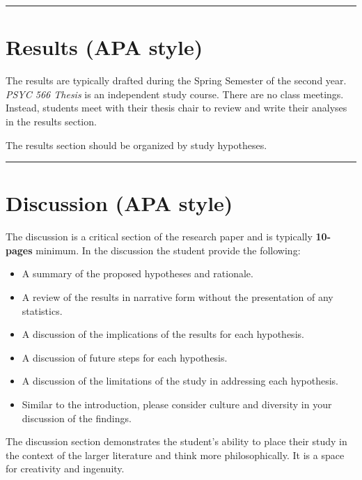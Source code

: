 \documentclass[
  openany]{book}
\providecommand{\tightlist}{%
  \setlength{\itemsep}{0pt}\setlength{\parskip}{0pt}}
\begin{document}
\begin{center}\rule{0.5\linewidth}{0.5pt}\end{center}

\hypertarget{results-apa-style}{%
\section{Results (APA style)}\label{results-apa-style}}

The results are typically drafted during the Spring Semester of the second year. \emph{PSYC 566 Thesis} is an independent study course. There are no class meetings. Instead, students meet with their thesis chair to review and write their analyses in the results section.

The results section should be organized by study hypotheses.

\begin{center}\rule{0.5\linewidth}{0.5pt}\end{center}

\hypertarget{discussion-apa-style}{%
\section{Discussion (APA style)}\label{discussion-apa-style}}

The discussion is a critical section of the research paper and is typically \textbf{10-pages} minimum. In the discussion the student provide the following:

\begin{itemize}
\tightlist
\item
  A summary of the proposed hypotheses and rationale.
\item
  A review of the results in narrative form without the presentation of any statistics.
\item
  A discussion of the implications of the results for each hypothesis.
\item
  A discussion of future steps for each hypothesis.
\item
  A discussion of the limitations of the study in addressing each hypothesis.
\item
  Similar to the introduction, please consider culture and diversity in your discussion of the findings.
\end{itemize}

The discussion section demonstrates the student's ability to place their study in the context of the larger literature and think more philosophically. It is a space for creativity and ingenuity.
\end{document}
